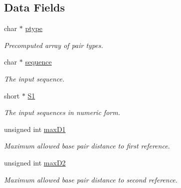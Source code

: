 \subsection*{Data Fields}
\begin{DoxyCompactItemize}
\item 
\mbox{\label{structTwoDpfold__vars_a67f37b8901b8d0a049c216d4c6241b07}} 
char $\ast$ \hyperlink{structTwoDpfold__vars_a67f37b8901b8d0a049c216d4c6241b07}{ptype}
\begin{DoxyCompactList}\small\item\em Precomputed array of pair types. \end{DoxyCompactList}\item 
\mbox{\label{structTwoDpfold__vars_a32c15a1e31856588259556c9020f32c6}} 
char $\ast$ \hyperlink{structTwoDpfold__vars_a32c15a1e31856588259556c9020f32c6}{sequence}
\begin{DoxyCompactList}\small\item\em The input sequence. \end{DoxyCompactList}\item 
\mbox{\label{structTwoDpfold__vars_a240311ae1e8e121441651d6101e187ac}} 
short $\ast$ \hyperlink{structTwoDpfold__vars_a240311ae1e8e121441651d6101e187ac}{S1}
\begin{DoxyCompactList}\small\item\em The input sequences in numeric form. \end{DoxyCompactList}\item 
\mbox{\label{structTwoDpfold__vars_a7292b6cbc1ee5bacf55e842f316c4bef}} 
unsigned int \hyperlink{structTwoDpfold__vars_a7292b6cbc1ee5bacf55e842f316c4bef}{max\+D1}
\begin{DoxyCompactList}\small\item\em Maximum allowed base pair distance to first reference. \end{DoxyCompactList}\item 
\mbox{\label{structTwoDpfold__vars_a8900622d91454d2d037242e290e42834}} 
unsigned int \hyperlink{structTwoDpfold__vars_a8900622d91454d2d037242e290e42834}{max\+D2}
\begin{DoxyCompactList}\small\item\em Maximum allowed base pair distance to second reference. \end{DoxyCompactList}\item 

\end{DoxyCompactItemize}

